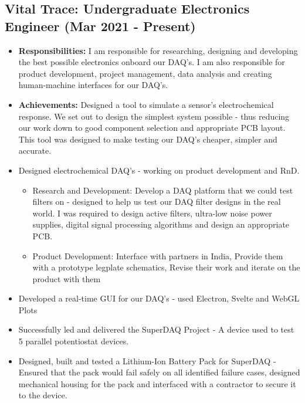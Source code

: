 \documentclass{article}[a4page]
\begin{document}
\subsection*{Vital Trace: Undergraduate Electronics Engineer (Mar 2021 - Present)}
\begin{itemize}
    \item \textbf{Responsibilities: } I am responsible for researching, designing and developing the best possible electronics onboard our DAQ's. I am also responsible for product development, project management, data analysis and creating human-machine interfaces for our DAQ's. 
    \item \textbf{Achievements: } Designed a tool to simulate a sensor's electrochemical response. We set out to design the simplest system possible - thus reducing our work down to good component selection and appropriate PCB layout. This tool was designed to make testing our DAQ's cheaper, simpler and accurate.
        \item Designed electrochemical DAQ's - working on product development and RnD.
        \begin{itemize}
            \item Research and Development: Develop a DAQ platform that we could test filters on - designed to help us test our DAQ filter designs in the real world. I was required to design active filters, ultra-low noise power supplies, digital signal processing algorithms and design an appropriate PCB.
            \item Product Development: Interface with partners in India, Provide them with a prototype legplate schematics, Revise their work and iterate on the product with them
        \end{itemize}
        \item Developed a real-time GUI for our DAQ's - used Electron, Svelte and WebGL Plots
        \item Successfully led and delivered the SuperDAQ Project - A device used to test 5 parallel potentiostat devices.
        \item Designed, built and tested a Lithium-Ion Battery Pack for SuperDAQ - Ensured that the pack would fail safely on all identified failure cases, designed mechanical housing for the pack and interfaced with a contractor to secure it to the device.
\end{itemize}
\end{document}
